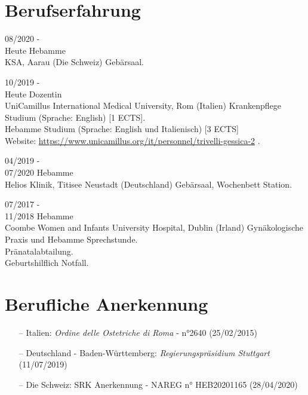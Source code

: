 \documentclass[11pt]{friggeri-cv}
\begin{document}
\vspace{-10pt}
\section{Berufserfahrung}
\begin{entrylist}
  \entry
  {08/2020 -\\Heute}
  {Hebamme}
  {\\KSA, Aarau (Die Schweiz)}
  {Geb\"{a}rsaal.}
  
  \entry
  {10/2019 -\\Heute}
  {Dozentin}
  {\\UniCamillus International Medical University, Rom (Italien)}
  {
    Krankenpflege Studium (Sprache: English) [1 ECTS].\\
    Hebamme Studium (Sprache: English und Italienisch) [3 ECTS] \\
    Website:
    \footnotesize{\url{https://www.unicamillus.org/it/personnel/trivelli-gessica-2}} .
  }

  \entry
  {04/2019 -\\07/2020}
  {Hebamme}
  {\\Helios Klinik, Titisee Neustadt (Deutschland)}
  {Geb\"{a}rsaal, Wochenbett Station.}

  \entry
  {07/2017 -\\11/2018}
  {Hebamme}
  {\\Coombe Women and Infants University Hospital, Dublin (Irland)}
  {
    Gyn\"{a}kologische Praxis und Hebamme Sprechstunde.\\
    Pr\"{a}natalabtailung.\\
    Geburtshilflich Notfall.
  }
\end{entrylist}


\vspace{10pt}
\section{Berufliche Anerkennung}
\begin{itemize}
  \item[--] Italien: \emph{Ordine delle Ostetriche di Roma} - n°2640 (25/02/2015)
  \item[--] Deutschland - Baden-W\"{u}rttemberg: \emph{Regierungspr\"{a}sidium Stuttgart} (11/07/2019)
  \item[--] Die Schweiz: SRK Anerkennung - NAREG n° HEB20201165 (28/04/2020)
\end{itemize}
\end{document}

